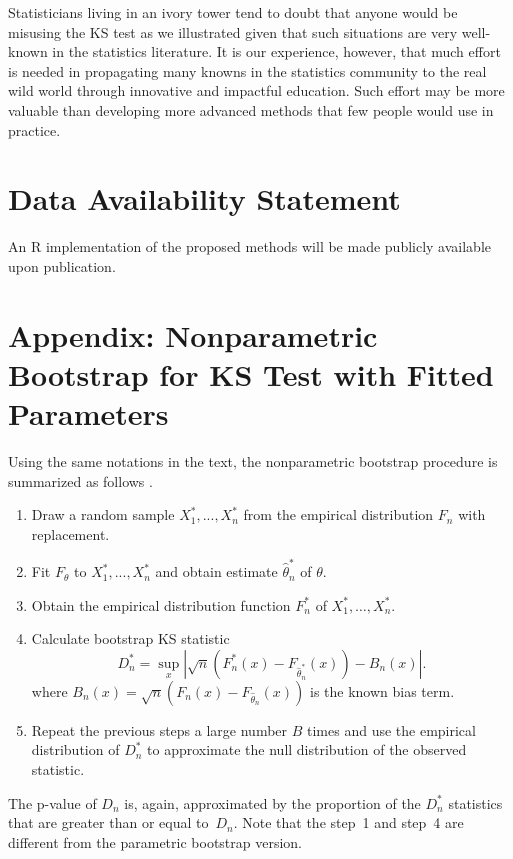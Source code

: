 \documentclass[12pt, letterpaper]{article}
\begin{document}
Statisticians living in
an ivory tower tend to doubt that anyone would be misusing the KS test as we
illustrated given that such situations are very well-known in the statistics
literature. It is our experience, however, that much effort is needed in
propagating many knowns in the statistics community to the real wild world
through innovative and impactful education. Such effort may be more valuable
than developing more advanced methods that few people would use in practice.


\section*{Data Availability Statement}
An R implementation of the proposed methods will be made publicly available upon 
publication.

\appendix

\section{Appendix: Nonparametric Bootstrap for KS Test with Fitted Parameters}

Using the same notations in the text, the nonparametric bootstrap procedure 
is summarized as follows \citep{babu2004goodness}.
\begin{enumerate}
\item
  Draw a random sample $X_1^*,...,X_n^*$ from the empirical distribution $F_n$
  with replacement.
\item
  Fit $F_\theta$ to $X_1^*,...,X_n^*$ and obtain estimate 
	$\hat\theta_n^*$ of $\theta$.
\item
  Obtain the empirical distribution function $F_n^*$ of
  $X_1^*, \ldots,  X_n^*$. 
\item
  Calculate bootstrap KS statistic
  \[
    D_n^* = \sup_x | \sqrt{n}\left(F_n^* (x)- F_{\hat\theta_n^*}(x)\right) - B_n(x) |.
  \]
  where $B_{n}(x) = \sqrt{n}(F_{n}(x) - F_{\hat\theta_n}(x))$ is the known
  bias term.
\item
  Repeat the previous steps a large number $B$ times and use the empirical
  distribution of $D_n^*$ to approximate the null distribution of the observed
  statistic. 
\end{enumerate}
The p-value of $D_n$ is, again, approximated by the proportion of the $D_n^*$
statistics that are greater than or equal to~$D_n$. Note that the step~1 and
step~4 are different from the parametric bootstrap version.



\end{document}
